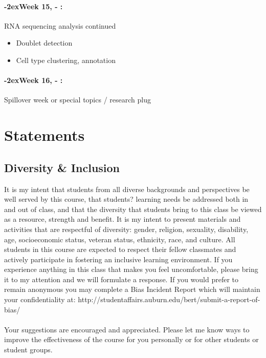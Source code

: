 \documentclass[11pt]{article}
\newcommand{\week}[1]{%
  \paragraph*{\kern-2ex\quad #1, \syldate{\today} - \AdvanceDate[4]\syldate{\today}:}%
  \ifdim\wd1=\wd\MONDAY
    \AdvanceDate[7]
  \else
    \AdvanceDate[7]
  \fi%
}
\begin{document}
\week{Week 15} RNA sequencing analysis continued
\begin{itemize}
\item Doublet detection
\item Cell type clustering, annotation
\end{itemize}

\week{Week 16} Spillover week or special topics / research plug

\section{Statements}
\subsection{Diversity \& Inclusion}
It is my intent that students from all diverse backgrounds and perspectives be well served by this course, that students? learning needs be addressed both in and out of class, and that the diversity that students bring to this class be viewed as a resource, strength and benefit. It is my intent to present materials and activities that are respectful of diversity: gender, religion, sexuality, disability, age, socioeconomic status, veteran status, ethnicity, race, and culture. All students in this course are expected to respect their fellow classmates and actively participate in fostering an inclusive learning environment.  If you experience anything in this class that makes you feel uncomfortable, please bring it to my attention and we will formulate a response.  If you would prefer to remain anonymous you may complete a Bias Incident Report which will maintain your confidentiality at: 
http://studentaffairs.auburn.edu/bert/submit-a-report-of-bias/ \\ \\
Your suggestions are encouraged and appreciated. Please let me know ways to improve the effectiveness of the course for you personally or for other students or student groups.
\end{document}
